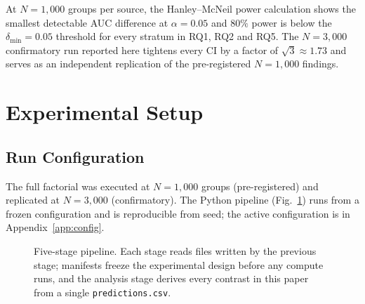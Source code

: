 \documentclass[10pt,twocolumn,a4paper]{article}
\begin{document}
At $N\!=\!1{,}000$ groups per source, the Hanley--McNeil power calculation shows the smallest detectable AUC difference at $\alpha\!=\!0.05$ and $80\%$ power is below the $\delta_\text{min}\!=\!0.05$ threshold for every stratum in RQ1, RQ2 and RQ5. The $N\!=\!3{,}000$ confirmatory run reported here tightens every CI by a factor of $\sqrt{3}\!\approx\!1.73$ and serves as an independent replication of the pre-registered $N\!=\!1{,}000$ findings.

\section{Experimental Setup}
\label{sec:experiments}

\subsection{Run Configuration}
The full factorial was executed at $N\!=\!1{,}000$ groups (pre-registered) and replicated at $N\!=\!3{,}000$ (confirmatory). The Python pipeline (Fig.~\ref{fig:pipeline}) runs from a frozen configuration and is reproducible from seed; the active configuration is in Appendix~\ref{app:config}.

\begin{figure}[t]
\centering
{}
\caption{Five-stage pipeline. Each stage reads files written by the previous stage; manifests freeze the experimental design before any compute runs, and the analysis stage derives every contrast in this paper from a single \texttt{predictions.csv}.}
\label{fig:pipeline}
\end{figure}
\end{document}

